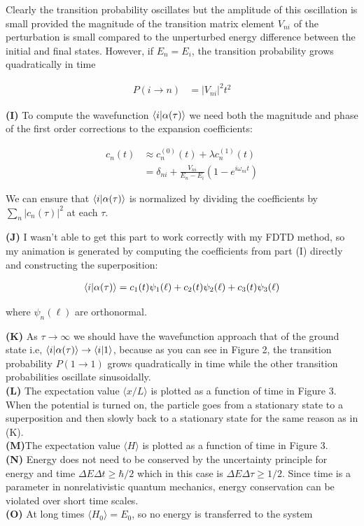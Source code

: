 \documentclass[12pt]{article}
\theoremstyle{definition}
\begin{document}
{Clearly the transition probability oscillates but the amplitude of this oscillation is small provided the magnitude of the transition matrix element $V_{ni}$ of the perturbation is small compared to the unperturbed energy difference between the initial and final states. However, if $E_{n} = E_{i}$, the transition probability grows quadratically in time


\begin{align}
P(i\rightarrow n) &= |V_{ni}|^{2}t^{2}
\end{align}

\noindent \textbf{(I)} To compute the wavefunction $\bra{i}\ket{\alpha(\tau)}$ we need both the magnitude and phase of the first order corrections to the expansion coefficients: 

\begin{align*}
c_{n}(t) &\approx c_{n}^{(0)}(t) + \lambda c_{n}^{(1)}(t)\\
&= \delta_{ni} + \frac{V_{ni}}{E_{n}-E_{i}}(1-e^{i\omega_{ni}t})
\end{align*}

We can ensure that $\bra{i}\ket{\alpha(\tau)}$ is normalized by dividing the coefficients by $\sum_{n}|c_{n}(\tau)|^{2}$ at each $\tau$.


\noindent \textbf{(J)} I wasn't able to get this part to work correctly with my FDTD method, so my animation is generated by computing the coefficients from part (I) directly and constructing the superposition:

\begin{align*}
\bra{i}\ket{\alpha(\tau)} = c_{1}(t)\psi_{1}(\ell) + c_{2}(t)\psi_{2}(\ell) + c_{3}(t)\psi_{3}(\ell)
\end{align*}

where $\psi_{n}(\ell)$ are orthonormal.

\noindent \textbf{(K)} As $\tau\rightarrow \infty$ we should have the wavefunction approach that of the ground state i.e, $\bra{i}\ket{\alpha(\tau)}\rightarrow \bra{i}\ket{1}$, because as you can see in Figure 2, the transition probability $P(1\rightarrow 1)$ grows quadratically in time while the other transition probabilities oscillate sinusoidally. 
\\
\noindent \textbf{(L)} The expectation value $\langle x/L\rangle$ is plotted as a function of time in Figure 3. When the potential is turned on, the particle goes from a stationary state to a superposition and then slowly back to a stationary state for the same reason as in (K).\\
\noindent \textbf{(M)}The expectation value $\langle H\rangle$ is plotted as a function of time in Figure 3.\\
\noindent \textbf{(N)} Energy does not need to be conserved by the uncertainty principle for energy and time $\Delta E\Delta t \geq \hbar/2$ which in this case is $\Delta E\Delta \tau \geq 1/2$. Since time is a parameter in nonrelativistic quantum mechanics, energy conservation can be violated over short time scales. \\
\noindent \textbf{(O)} At long times $\langle H_{0} \rangle = E_{0}$, so no energy is transferred to the system\\



}
\end{document}
